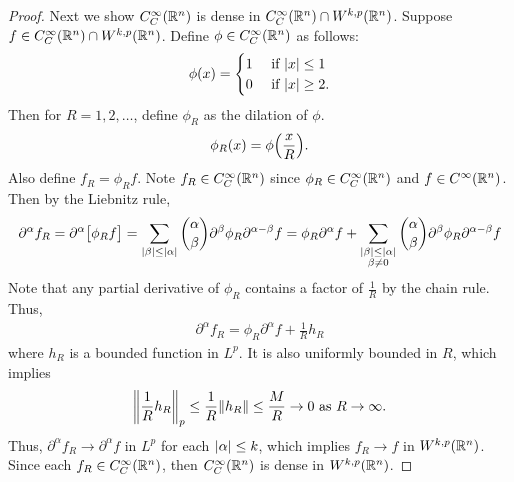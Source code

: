 \documentclass{article} %
\theoremstyle{plain}
\def\Rl{\mathbb{R}}
\numberwithin{equation}{section} %
\numberwithin{figure}{section} %
\numberwithin{table}{section} %
\begin{document}
\begin{proof}
    Next we show $C_C^\infty\qty(\Rl^n)$ is dense in $C_C^\infty\qty(\Rl^n) \cap W^{k,p}\qty(\Rl^n)$.  Suppose $f \in C_C^\infty\qty(\Rl^n) \cap W^{k,p}\qty(\Rl^n)$.  Define $\phi \in C_C^\infty\qty(\Rl^n)$ as follows:
    \begin{align*}
        \phi(x) = \begin{cases}
            1 &\ \text{if } \abs{x} \leq 1 \\
            0 &\ \text{if } \abs{x} \geq 2.
        \end{cases}
    \end{align*}
    Then for $R = 1, 2, \dots$, define $\phi_R$ as the dilation of $\phi$.
    \begin{align*}
        \phi_R(x) = \phi\qty(\frac{x}{R}).
    \end{align*}
    Also define $f_R = \phi_R f$.  Note $f_R \in C_C^\infty\qty(\Rl^n)$ since $\phi_R \in C_C^\infty\qty(\Rl^n)$ and $f \in C^\infty\qty(\Rl^n)$.  Then by the Liebnitz rule,
    \begin{align*}
        \partial^\alpha f_R = \partial^\alpha \big[\phi_R f\big] = \sum_{\abs{\beta} \leq \abs{\alpha}} \binom{\alpha}{\beta}\partial^\beta \phi_R \partial^{\alpha - \beta} f = \phi_R \partial^\alpha f + \sum_{\substack{\abs{\beta} \leq \abs{\alpha} \\ \beta \neq 0}} \binom{\alpha}{\beta}\partial^\beta \phi_R \partial^{\alpha - \beta} f
    \end{align*}
    Note that any partial derivative of $\phi_R$ contains a factor of $\frac{1}{R}$ by the chain rule.  Thus,
    \begin{align*}
        \partial^\alpha f_R = \phi_R \partial^\alpha f + \frac{1}{R}h_R
    \end{align*}
    where $h_R$ is a bounded function in $L^p$.  It is also uniformly bounded in $R$, which implies
    \begin{align*}
        \norm{\frac{1}{R}h_R}_p \leq \frac{1}{R}\norm{h_R} \leq \frac{M}{R} \rightarrow 0 \text{ as } R \rightarrow \infty.
    \end{align*}
    Thus, $\partial^\alpha f_R \rightarrow \partial^\alpha f$ in $L^p$ for each $\abs{\alpha} \leq k$, which implies $f_R \rightarrow f$ in $W^{k,p}\qty(\Rl^n)$.  Since each $f_R \in C_C^\infty\qty(\Rl^n)$, then $C_C^\infty\qty(\Rl^n)$ is dense in $W^{k,p}\qty(\Rl^n)$.
\end{proof}
\end{document}
